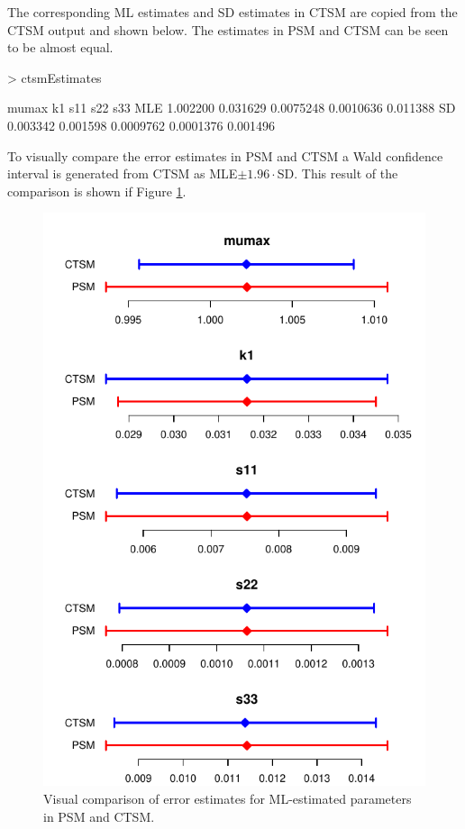 \documentclass{article}
\renewenvironment{Schunk}
{\begin{center} \begin{boxedminipage}{0.95\textwidth} }
{\end{boxedminipage}\end{center}}
\begin{document}
The corresponding ML estimates and SD estimates in CTSM are copied
from the CTSM output and shown below. The estimates in PSM and CTSM
can be seen to be almost equal.

\begin{Schunk}
\begin{Sinput}
> ctsmEstimates
\end{Sinput}
\begin{Soutput}
       mumax       k1       s11       s22      s33
MLE 1.002200 0.031629 0.0075248 0.0010636 0.011388
SD  0.003342 0.001598 0.0009762 0.0001376 0.001496
\end{Soutput}
\end{Schunk}

To visually compare the error estimates in PSM and CTSM a Wald confidence interval
is generated from CTSM as MLE$\pm 1.96 \cdot$SD. This result of the
comparison is shown if Figure \ref{fig:fig1}.


\begin{figure}[hptb]
\begin{center}
\includegraphics{PSMvsCTSM-figure1}
\end{center}
\caption{Visual comparison of error estimates for ML-estimated parameters in
  PSM and CTSM.}
\label{fig:fig1}
\end{figure}
\end{document}
